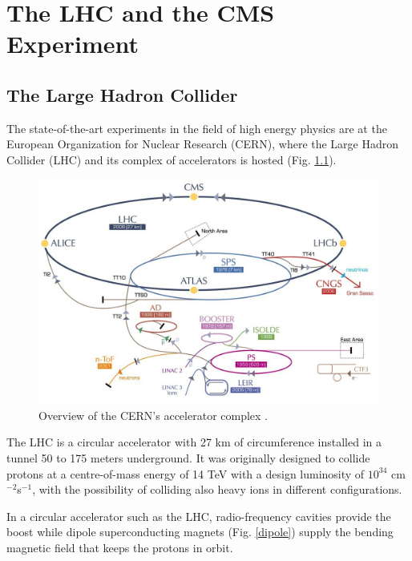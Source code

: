 \chapter{The LHC and the CMS Experiment}
\section{The Large Hadron Collider}

The state-of-the-art experiments in the field of high energy physics are at the European Organization for Nuclear Research (CERN), where the Large Hadron Collider (LHC) and its complex of accelerators is hosted (Fig. \ref{cernplot}).
\begin{figure}[htb!!!!]
\centering
\includegraphics[scale=0.65]{figures/experiment/cernComplex.jpg}
\caption[CERN's Accelerator Complex]{Overview of the CERN's accelerator complex \cite{Mobs:2225847}.}
\label{cernplot}
\end{figure}

The LHC is a circular accelerator with 27 km of circumference installed in a tunnel 50 to 175 meters underground. It was originally designed to collide protons at a centre-of-mass energy of 14 TeV with a design luminosity of $10^{34}$ cm$^{-2}$s$^{-1}$, with the possibility of colliding also heavy ions in different configurations. 

In a circular accelerator such as the LHC, radio-frequency cavities provide the boost while dipole superconducting magnets (Fig. \ref{dipole}) supply the bending magnetic field that keeps the protons in orbit.

